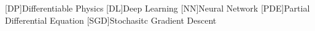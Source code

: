 [DP]{Differentiable Physics}
[DL]{Deep Learning}
[NN]{Neural Network}
[PDE]{Partial Differential Equation}
[SGD]{Stochasitc Gradient Descent}
